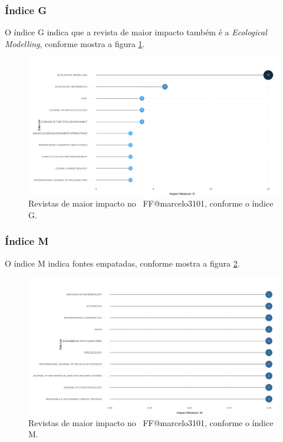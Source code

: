 \subsubsection{Índice G}

O índice G indica que a revista de maior impacto também é a \textit{Ecological Modelling}, conforme mostra a figura \ref{fig:FF@marcelo3101:G-Index-Source-Local-Impact.png}.

\begin{figure}
    \centering
    \includegraphics[width=1\textwidth]{exploratory-data-analysis/marcelo3101/PesqBibliogr/ForestFire/WoS-20221204/assets/SourceImpactGindex.png}
    \caption{Revistas de maior impacto no  \dataset\ FF@marcelo3101,  conforme o índice G.}
    \label{fig:FF@marcelo3101:G-Index-Source-Local-Impact.png}
\end{figure}

\subsubsection{Índice M}

O índice M indica fontes empatadas, conforme mostra a figura \ref{fig:FF@marcelo3101:M-Index-Source-Local-Impact.png}.

\begin{figure}
    \centering
    \includegraphics[width=1\textwidth]{exploratory-data-analysis/marcelo3101/PesqBibliogr/ForestFire/WoS-20221204/assets/SourceImpactMindex.png}
    \caption{Revistas de maior impacto no  \dataset\ FF@marcelo3101,  conforme o índice M.}
    \label{fig:FF@marcelo3101:M-Index-Source-Local-Impact.png}
\end{figure}

